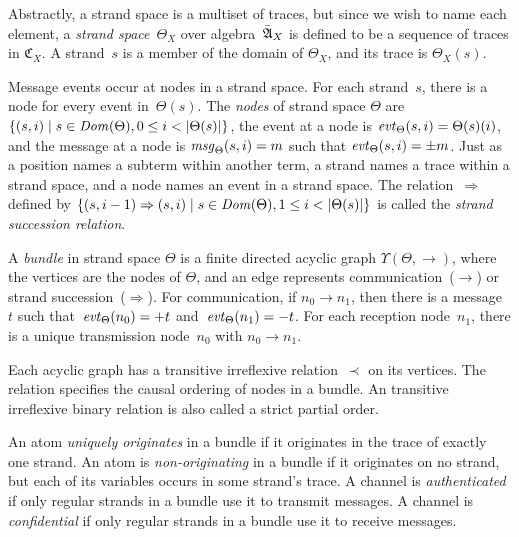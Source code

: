 \documentclass[12pt]{report}
\theoremstyle{definition}
\newcommand{\algbara}{\bar{\alg{A}}}
\newcommand{\tr}{\ensuremath{\mathfrak C}}
\newcommand{\sdom}{\fn{Dom}}
\newcommand{\evt}{\fn{evt}}
\newcommand{\msg}{\fn{msg}}
\begin{document}
Abstractly, a strand space is a multiset of traces, but since we wish
to name each element, a \emph{strand
  space}~$\Theta_X$ over algebra~$\algbara_X$ is defined to be a sequence
of traces in $\tr_X$.  A strand~$s$ is a member of the domain of
$\Theta_X$, and its trace is $\Theta_X(s)$.

Message events occur at nodes in a strand space.  For each strand~$s$,
there is a node for every event in~$\Theta(s)$.  The
\emph{nodes} of strand space $\Theta$ are $\{(s,i)\mid
s\in\sdom(\Theta), 0\leq i< |\Theta(s)|\}$, the event at a node is
\index{evt@\evt}$\evt_\Theta(s,i)=\Theta(s)(i)$, and the message at a
node is \index{msg@\msg}$\msg_\Theta(s,i) = m$ such that
$\evt_\Theta(s,i) = \pm m$.  Just as a position names a subterm within
another term, a strand names a trace within a strand space, and a node
names an event in a strand space.  The relation~$\Rightarrow$ defined
by $\{(s,i-1)\Rightarrow(s,i)\mid s\in\sdom(\Theta), 1\leq
i<|\Theta(s)|\}$ is called the \emph{strand
  succession relation}.

A \emph{bundle} in strand space $\Theta$ is a finite
directed acyclic graph $\Upsilon(\Theta,\to)$, where the vertices are
the nodes of $\Theta$, and an edge represents
communication~($\rightarrow$) or strand succession~($\Rightarrow$).
For communication, if $n_0\rightarrow n_1$, then
there is a message~$t$ such that~$\evt_\Theta(n_0)=\outbnd t$
and~$\evt_\Theta(n_1)=\inbnd t$.  For each reception node~$n_1$, there
is a unique transmission node~$n_0$ with $n_0\rightarrow n_1$.

Each acyclic graph has a transitive irreflexive relation~$\prec$ on
its vertices.  The relation specifies the causal ordering of nodes in
a bundle.  An transitive irreflexive binary relation is also called a
strict partial
order.

An atom \emph{uniquely originates} in a
bundle if it originates in the trace of exactly one strand.  An atom
is \emph{non-originating} in a bundle if it
originates on no strand, but each of its variables occurs in some
strand's trace.  A channel is \emph{authenticated} if only regular strands in a bundle use
it to transmit messages.  A channel is \emph{confidential} if only regular strands in a bundle use
it to receive messages.
\end{document}
